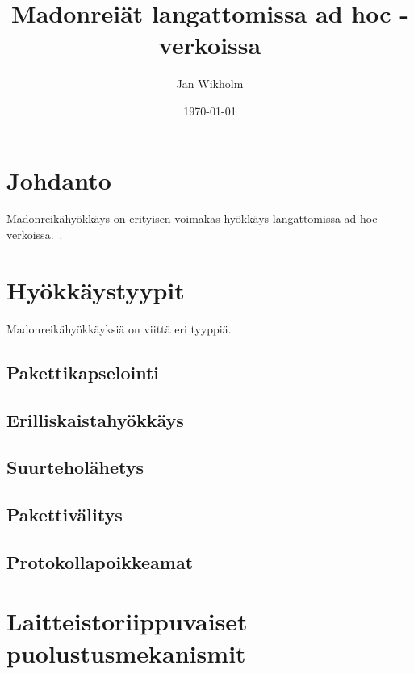 \documentclass[finnish]{tktltiki2}
\title{Madonreiät langattomissa ad hoc -verkoissa}
\author{Jan Wikholm}
\date{\today}
\theoremstyle{definition}
\theoremstyle{remark}
\begin{document}

\frontmatter      %

\maketitle        %
\makeabstract     %

\tableofcontents  %


\mainmatter       %

\section{Johdanto}


Madonreikähyökkäys on erityisen voimakas hyökkäys langattomissa ad hoc -verkoissa.~\cite{leashes,deworm,liteworp,delphi,antenna}.

\newpage
\section{Hyökkäystyypit}

Madonreikähyökkäyksiä on viittä eri tyyppiä. \cite[s. 3-4]{liteworp}

\subsection{Pakettikapselointi}
\subsection{Erilliskaistahyökkäys}
\subsection{Suurteholähetys}
\subsection{Pakettivälitys}
\subsection{Protokollapoikkeamat}

\newpage
\section{Laitteistoriippuvaiset puolustusmekanismit}
\end{document}
